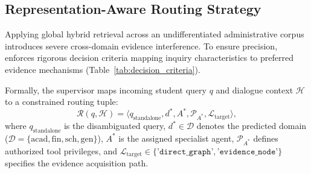 \subsection{Representation-Aware Routing Strategy}
\label{sec:selection_criteria}

Applying global hybrid retrieval across an undifferentiated administrative corpus introduces severe cross-domain evidence interference. To ensure precision, \system{} enforces rigorous decision criteria mapping inquiry characteristics to preferred evidence mechanisms (Table~\ref{tab:decision_criteria}).

\begin{table}[!htbp]
\centering
\caption{Decision criteria for evidence representation and retrieval mechanism selection.}
\label{tab:decision_criteria}
\end{table}

Formally, the supervisor maps incoming student query $q$ and dialogue context $\mathcal{H}$ to a constrained routing tuple:
\begin{equation}
    \mathcal{R}(q, \mathcal{H}) = \langle q_{\text{standalone}}, d^*, A^*, \mathcal{P}_{A^*}, \mathcal{L}_{\text{target}} \rangle,
\end{equation}
where $q_{\text{standalone}}$ is the disambiguated query, $d^* \in \mathcal{D}$ denotes the predicted domain ($\mathcal{D} = \{\text{acad}, \text{fin}, \text{sch}, \text{gen}\}$), $A^*$ is the assigned specialist agent, $\mathcal{P}_{A^*}$ defines authorized tool privileges, and $\mathcal{L}_{\text{target}} \in \{\texttt{'direct\_graph'}, \texttt{'evidence\_node'}\}$ specifies the evidence acquisition path.

